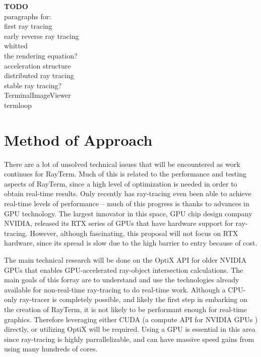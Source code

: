 \documentclass[11pt]{article}
\newcommand{\name}{{\sc RayTerm}}
\newcommand\todo[1]{
\begin{center}
  \color{red}
  {\bf TODO}\\
  #1
\end{center}
}
\begin{document}
\todo{
paragraphs for:\\
first ray tracing\\
early reverse ray tracing\\
whitted\\
the rendering equation?\\
acceleration structure\\
distributed ray tracing\\
stable ray tracing?\\
TerminalImageViewer\\
termloop\\
}


\section{Method of Approach}
\label{sec:method}



There are a lot of unsolved technical issues that will be encountered as work continues for \name.
Much of this is related to the performance and testing aspects of \name, since a high level of optimization is needed in order to obtain real-time results.
Only recently has ray-tracing even been able to achieve real-time levels of performance -- much of this progress is thanks to advances in GPU technology.
The largest innovator in this space, GPU chip design company NVIDIA, released its RTX series of GPUs that have hardware support for ray-tracing.
However, although fascinating, this proposal will not focus on RTX hardware, since its spread is slow due to the high barrier to entry because of cost.

The main technical research will be done on the OptiX API \cite{parker2010optix} for older NVIDIA GPUs that enables GPU-accelerated ray-object intersection calculations.
The main goals of this forray are to understand and use the technologies already available for non-real-time ray-tracing to do real-time work.
Although a CPU-only ray-tracer is completely possible, and likely the first step in embarking on the creation of \name, it is not likely to be performant enough for real-time graphics.
Therefore leveraging either CUDA (a compute API for NVIDIA GPUs \cite{nvidia2011cuda}) directly, or utilizing OptiX will be required.
Using a GPU is essential in this area since ray-tracing is highly parrallelizable, and can have massive speed gains from using many hundreds of cores.
\end{document}
